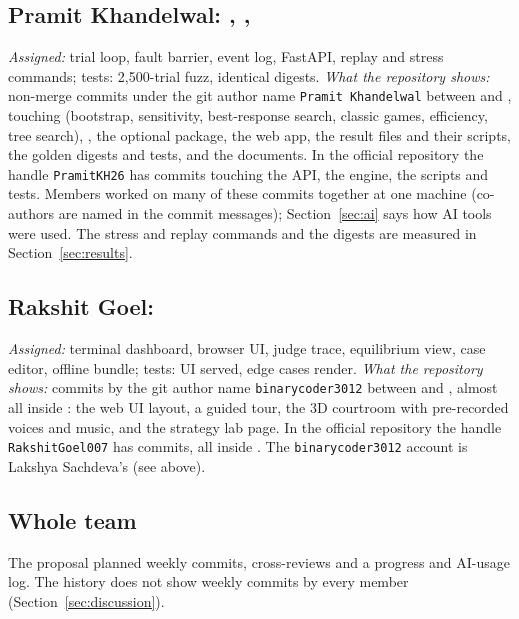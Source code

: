 \subsection*{Pramit Khandelwal: , , }
\emph{Assigned:} trial loop, fault barrier, event log, FastAPI, replay and stress commands; tests: 2,500-trial fuzz, identical digests. \emph{What the repository shows:} \CommitsPramit{} non-merge commits under the git author name \texttt{Pramit Khandelwal} between \FirstPramit{} and \LastPramit{}, touching  (bootstrap, sensitivity, best-response search, classic games, efficiency, tree search), , the optional  package, the web app, the result files and their scripts, the golden digests and tests, and the documents. In the official repository the handle \texttt{PramitKH26} has \CoursePramit{} commits touching the API, the engine, the scripts and tests. Members worked on many of these commits together at one machine (co-authors are named in the commit messages); Section~\ref{sec:ai} says how AI tools were used. The stress and replay commands and the digests are measured in Section~\ref{sec:results}. 

\subsection*{Rakshit Goel: }
\emph{Assigned:} terminal dashboard, browser UI, judge trace, equilibrium view, case editor, offline bundle; tests: UI served, edge cases render. \emph{What the repository shows:} \CommitsBinarycoder{} commits by the git author name \texttt{binarycoder3012} between \FirstBinarycoder{} and \LastBinarycoder{}, almost all inside : the web UI layout, a guided tour, the 3D courtroom with pre-recorded voices and music, and the strategy lab page. In the official repository the handle \texttt{RakshitGoel007} has \CourseRakshit{} commits, all inside . The \texttt{binarycoder3012} account is Lakshya Sachdeva's (see above). 

\subsection*{Whole team}
The proposal planned weekly commits, cross-reviews and a progress and AI-usage log. The history does not show weekly commits by every member (Section~\ref{sec:discussion}). 
